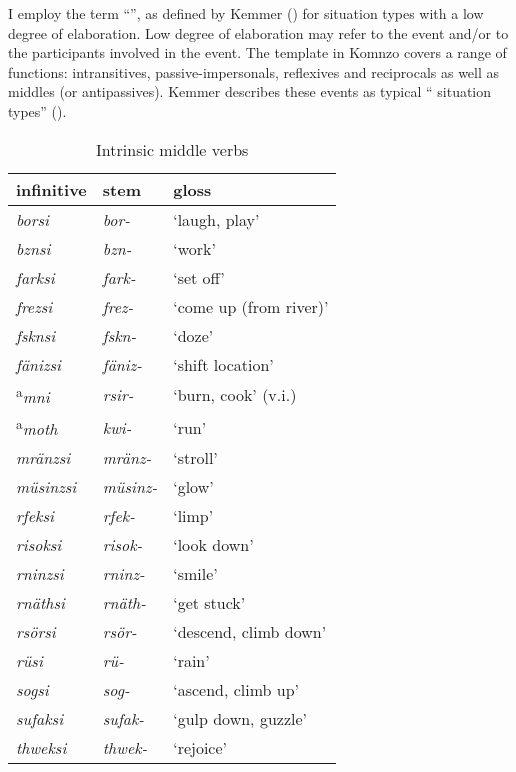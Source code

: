 I employ the term ``'', as defined by Kemmer (\citeyear[207-210]{Kemmer:1993wda}) for situation types with a low degree of elaboration. Low degree of elaboration may refer to the event and/or to the participants involved in the event. The  template in Komnzo covers a range of functions: intransitives, passive-impersonals, reflexives and reciprocals as well as  middles (or antipassives). Kemmer describes these events as typical `` situation types'' (\citeyear[15]{Kemmer:1993wda}).

\begin{table}
\caption{Intrinsic middle verbs}
\label{intrinsicmiddleverbs}
	\begin{tabularx}{.7\textwidth}{XXl}
		\lsptoprule
		infinitive&{\Ext} stem&gloss\\  \midrule
		\emph{borsi}		& \emph{bor-}				& `laugh, play'\\
		\emph{bznsi}		& \emph{bzn-}				& `work'\\
		\emph{farksi}		& \emph{fark-}				& `set off'\\
		\emph{frezsi}		& \emph{frez-}				& `come up (from river)'\\
		\emph{fsknsi}		& \emph{fskn-}				& `doze'\\
		\emph{fänizsi}		& \emph{fäniz-}				& `shift location'\\
		\textsuperscript{a}\emph{mni}		& \emph{rsir-}				& `burn, cook' (v.i.)\\
		\textsuperscript{a}\emph{moth}		& \emph{kwi-}				& `run'\\
		\emph{mränzsi}		& \emph{mränz-}				& `stroll'\\
		\emph{müsinzsi}		& \emph{müsinz-}			& `glow'\\
		\emph{rfeksi}		& \emph{rfek-}				& `limp'\\
		\emph{risoksi}		& \emph{risok-}				& `look down'\\
		\emph{rninzsi}		& \emph{rninz-}				& `smile'\\
		\emph{rnäthsi}		& \emph{rnäth-}				& `get stuck'\\
		\emph{rsörsi}		& \emph{rsör-}				& `descend, climb down'\\
		\emph{rüsi}			& \emph{rü-}				& `rain'\\
		\emph{sogsi}		& \emph{sog-}				& `ascend, climb up'\\
		\emph{sufaksi}		& \emph{sufak-}				& `gulp down, guzzle'\\
		\emph{thweksi}		& \emph{thwek-}				& `rejoice'\\

\end{tabularx}
\end{table}
